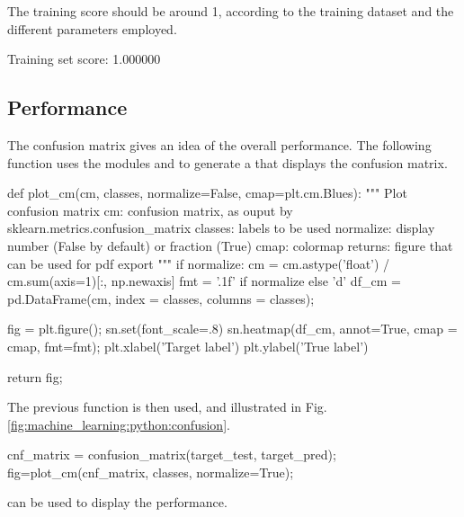 The training score should be around 1, according to the training dataset and the different parameters employed.
\begin{sh}
Training set score: 1.000000
\end{sh}

\vspace*{-8pt}

\subsection{Performance}
The confusion matrix gives an idea of the overall performance. The following function uses the modules  and  to generate a  that displays the confusion matrix.

\begin{python}
def plot_cm(cm, classes, normalize=False, cmap=plt.cm.Blues):
    """
    Plot confusion matrix
    cm: confusion matrix, as ouput by sklearn.metrics.confusion_matrix
    classes: labels to be used
    normalize: display number (False by default) or fraction (True)
    cmap: colormap
    returns: figure that can be used for pdf export
    """
    if normalize:
        cm = cm.astype('float') / cm.sum(axis=1)[:, np.newaxis] 
    fmt = '.1f' if normalize else 'd'
    df_cm = pd.DataFrame(cm, index = classes, columns = classes);
    
    fig = plt.figure();
    sn.set(font_scale=.8)
    sn.heatmap(df_cm, annot=True, cmap = cmap, fmt=fmt);
    plt.xlabel('Target label')
    plt.ylabel('True label')
    
    return fig;
\end{python}

The previous function is then used, and illustrated in Fig.\ref{fig:machine_learning:python:confusion}.
\begin{python}
cnf_matrix = confusion_matrix(target_test, target_pred);
fig=plot_cm(cnf_matrix, classes, normalize=True);
\end{python}

 can be used to display the performance.

